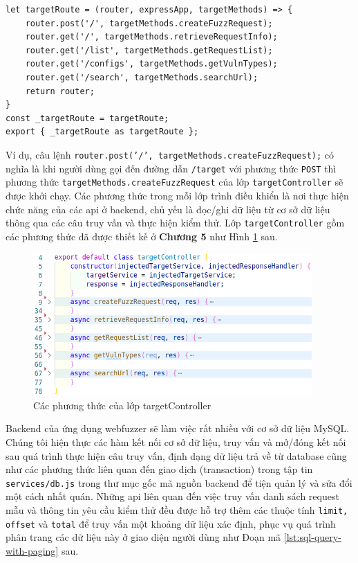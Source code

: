 \begin{lstlisting}[style=ES6, label={lst:add-routes-to-router}, caption={Định nghĩa đường dẫn cho các \acrshort{api} thuộc lớp target}]
let targetRoute = (router, expressApp, targetMethods) => {
    router.post('/', targetMethods.createFuzzRequest);
    router.get('/', targetMethods.retrieveRequestInfo);
    router.get('/list', targetMethods.getRequestList);
    router.get('/configs', targetMethods.getVulnTypes);
    router.get('/search', targetMethods.searchUrl);
    return router;
}
const _targetRoute = targetRoute;
export { _targetRoute as targetRoute };
\end{lstlisting}
Ví dụ, câu lệnh \colorbox{gray!30}{\texttt{router.post('/', targetMethods.createFuzzRequest);}} có nghĩa là khi người dùng gọi đến đường dẫn \texttt{/target} với phương thức \texttt{POST} thì phương thức \texttt{targetMethods.createFuzzRequest} của lớp \texttt{targetController} sẽ được khởi chạy. Các phương thức trong mỗi lớp trình điều khiển là nơi thực hiện chức năng của các \acrshort{api} ở backend, chủ yếu là đọc/ghi dữ liệu từ cơ sở dữ liệu thông qua các câu truy vấn và thực hiện kiểm thử. Lớp \texttt{targetController} gồm các phương thức đã được thiết kế ở \textbf{Chương 5} như Hình \ref{fig:implement-target-controller-class} sau.
\begin{figure}[H]
  \centering
    \includegraphics[width=0.95\textwidth,keepaspectratio=true]{images/implement-target-controller-class.png}
  \caption{Các phương thức của lớp targetController}
  \label{fig:implement-target-controller-class}
\end{figure}
Backend của ứng dụng webfuzzer sẽ làm việc rất nhiều với cơ sở dữ liệu MySQL. Chúng tôi hiện thực các hàm kết nối cơ sở dữ liệu, truy vấn và mở/đóng kết nối sau quá trình thực hiện câu truy vấn, định dạng dữ liệu trả về từ database cũng như các phương thức liên quan đến giao dịch (transaction) trong tập tin \texttt{services/db.js} trong thư mục gốc mã nguồn backend để tiện quản lý và sửa đổi một cách nhất quán. Những \acrshort{api} liên quan đến việc truy vấn danh sách request mẫu và thông tin yêu cầu kiểm thử đều được hỗ trợ thêm các thuộc tính \texttt{limit, offset} và \texttt{total} để truy vấn một khoảng dữ liệu xác định, phục vụ quá trình phân trang các dữ liệu này ở giao diện người dùng như Đoạn mã \ref{lst:sql-query-with-paging} sau.

